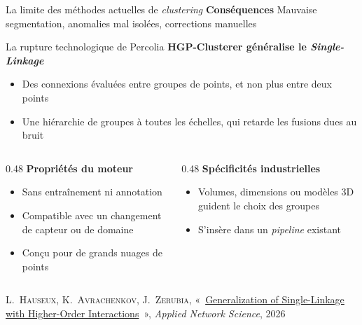 \documentclass[A4,svgnames,10pt,aspectratio=169,usepdftitle=false]{beamer}
\begin{document}
\begin{frame}{La limite des méthodes actuelles de \emph{clustering}}
    \vspace{0.25cm}
    \textbf{\orange Conséquences} Mauvaise segmentation, anomalies mal isolées, corrections manuelles
\end{frame}

\begin{frame}{La rupture technologique de Percolia}
    \textbf{\bleu HGP-Clusterer généralise le \emph{Single-Linkage}}
    \begin{itemize}
        \item Des connexions évaluées entre groupes de points, et non plus entre deux points
        \item Une hiérarchie de groupes à toutes les échelles, qui retarde les fusions dues au bruit
    \end{itemize}

    \vspace{0.2cm}
    \begin{columns}[T]
        \begin{column}{0.48\textwidth}
            \textbf{\bleu Propriétés du moteur}
            \begin{itemize}
                \item Sans entraînement ni annotation
                \item Compatible avec un changement de capteur ou de domaine
                \item Conçu pour de grands nuages de points
            \end{itemize}
        \end{column}

        \begin{column}{0.48\textwidth}
            \textbf{\bleu Spécificités industrielles}
            \begin{itemize}
                \item Volumes, dimensions ou modèles 3D guident le choix des groupes
                \item S'insère dans un \emph{pipeline} existant
            \end{itemize}
        \end{column}
    \end{columns}

    \vfill
    {\tiny \textcolor{inria-2024-gris-bleu}{L.~\textsc{Hauseux}, K.~\textsc{Avrachenkov}, J.~\textsc{Zerubia}, «~\href{https://doi.org/10.1007/s41109-025-00756-1}{\foreignlanguage{english}{Generalization of Single-Linkage with Higher-Order Interactions}}~», \emph{Applied Network Science}, 2026}\par}
\end{frame}
\end{document}
